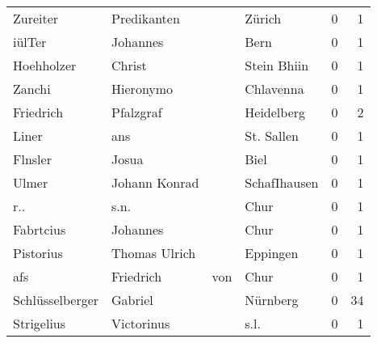 \begin{tabular}{llllrr}
                 Zureiter &                        Predikanten &             &                                      Zürich &          0 &         1 \\
                   iülTer &                           Johannes &             &                                        Bern &          0 &         1 \\
               Hoehholzer &                             Christ &             &                                 Stein Bhiin &          0 &         1 \\
                   Zanchi &                          Hieronymo &             &                                   Chlavenna &          0 &         1 \\
                Friedrich &                          Pfalzgraf &             &                                  Heidelberg &          0 &         2 \\
                    Liner &                                ans &             &                                  St. Sallen &          0 &         1 \\
                  Flnsler &                              Josua &             &                                        Biel &          0 &         1 \\
                    Ulmer &                      Johann Konrad &             &                                SchafIhausen &          0 &         1 \\
                      r.. &                               s.n. &             &                                        Chur &          0 &         1 \\
                Fabrtcius &                           Johannes &             &                                        Chur &          0 &         1 \\
                Pistorius &                      Thomas Ulrich &             &                                    Eppingen &          0 &         1 \\
                      afs &                          Friedrich &         von &                                        Chur &          0 &         1 \\
          Schlüsselberger &                            Gabriel &             &                                    Nürnberg &          0 &        34 \\
               Strigelius &                         Victorinus &             &                                        s.l. &          0 &         1 \\

\end{tabular}
